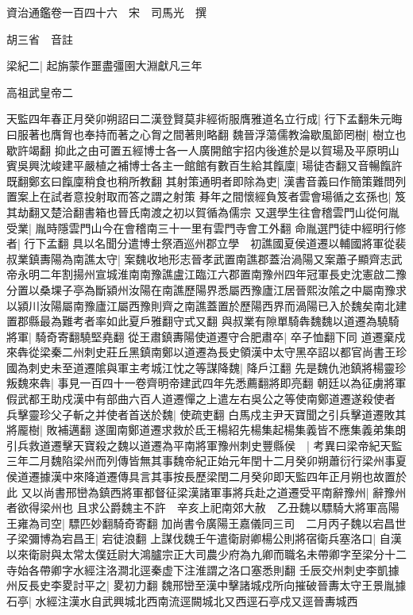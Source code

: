 資治通鑑卷一百四十六　宋　司馬光　撰

胡三省　音註

梁紀二|{
	起旃蒙作噩盡彊圉大淵獻凡三年}


高祖武皇帝二

天監四年春正月癸卯朔詔曰二漢登賢莫非經術服膺雅道名立行成|{
	行下孟翻朱元晦曰服著也膺胷也奉持而著之心胷之間著則略翻}
魏晉浮蕩儒教淪歇風節罔樹|{
	樹立也歇許竭翻}
抑此之由可置五經博士各一人廣開館宇招内後進於是以賀瑒及平原明山賓吳興沈峻建平嚴植之補博士各主一館館有數百生給其餼廩|{
	瑒徒杏翻又音暢餼許既翻鄭玄曰餼廩稍食也稍所教翻}
其射策通明者即除為吏|{
	漢書音義曰作簡策難問列置案上在試者意投射取而答之謂之射策}
朞年之間懷經負笈者雲會瑒循之玄孫也|{
	笈其劫翻又楚洽翻書箱也晉氏南渡之初以賀循為儒宗}
又選學生往會稽雲門山從何胤受業|{
	胤時隱雲門山今在會稽南三十一里有雲門寺會工外翻}
命胤選門徒中經明行修者|{
	行下孟翻}
具以名聞分遣博士祭酒巡州郡立學　初譙國夏侯道遷以輔國將軍從裴叔業鎮夀陽為南譙太守|{
	案魏收地形志晉孝武置南譙郡蓋治渦陽又案蕭子顯齊志武帝永明二年割揚州宣城淮南南豫譙盧江臨江六郡置南豫州四年冠軍長史沈憲啟二豫分置以桑堁子亭為斷潁州汝陽在南譙歷陽界悉屬西豫廬江居晉熙汝隂之中屬南豫求以潁川汝陽屬南豫廬江屬西豫則齊之南譙蓋置於歷陽西界而渦陽已入於魏矣南北建置郡縣最為難考者率如此夏戶雅翻守式又翻}
與叔業有隙單騎犇魏魏以道遷為驍騎將軍|{
	騎奇寄翻驍堅堯翻}
從王肅鎮夀陽使道遷守合肥肅卒|{
	卒子恤翻下同}
道遷棄戍來犇從梁秦二州刺史莊丘黑鎮南鄭以道遷為長史領漢中太守黑卒詔以都官尚書王珍國為刺史未至道遷隂與軍主考城江忱之等謀降魏|{
	降戶江翻}
先是魏仇池鎮將楊靈珍叛魏來犇|{
	事見一百四十一卷齊明帝建武四年先悉薦翻將即亮翻}
朝廷以為征虜將軍假武都王助戍漢中有部曲六百人道遷憚之上遣左右吳公之等使南鄭道遷遂殺使者兵擊靈珍父子斬之并使者首送於魏|{
	使疏吏翻}
白馬戍主尹天寶聞之引兵擊道遷敗其將龎樹|{
	敗補邁翻}
遂圍南鄭道遷求救於氐王楊紹先楊集起楊集義皆不應集義弟集朗引兵救道遷擊天寶殺之魏以道遷為平南將軍豫州刺史豐縣侯　|{
	考異曰梁帝紀天監三年二月魏陷梁州而列傳皆無其事魏帝紀正始元年閏十二月癸卯朔蕭衍行梁州事夏侯道遷據漢中來降道遷傳具言其事按長歷梁閏二月癸卯即天監四年正月朔也故置於此}
又以尚書邢巒為鎮西將軍都督征梁漢諸軍事將兵赴之道遷受平南辭豫州|{
	辭豫州者欲得梁州也}
且求公爵魏主不許　辛亥上祀南郊大赦　乙丑魏以驃騎大將軍高陽王雍為司空|{
	驃匹妙翻騎奇寄翻}
加尚書令廣陽王嘉儀同三司　二月丙子魏以宕昌世子梁彌博為宕昌王|{
	宕徒浪翻}
上謀伐魏壬午遣衛尉卿楊公則將宿衛兵塞洛口|{
	自漢以來衛尉與太常太僕廷尉大鴻臚宗正大司農少府為九卿而職名未帶卿字至梁分十二寺始各帶卿字水經注洛澗北逕秦虚下注淮謂之洛口塞悉則翻}
壬辰交州刺史李凱據州反長史李畟討平之|{
	畟初力翻}
魏邢巒至漢中擊諸城戍所向摧破晉夀太守王景胤據石亭|{
	水經注漢水自武興城北西南流逕闕城北又西逕石亭戍又逕晉夀城西}
